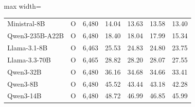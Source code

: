\begin{table}[htbp]
\begin{adjustbox}{max width=\linewidth}
\begin{tabular}{lrrrrrr}
Ministral-8B & \textsf{O} & 6{,}480 & \cellcolor[HTML]{ffb070}14.04 & \cellcolor[HTML]{ffb070}13.63 & \cellcolor[HTML]{ffb070}13.58 & \cellcolor[HTML]{ffb070}13.40 \\
Qwen3-235B-A22B & \textsf{O} & 6{,}480 & \cellcolor[HTML]{ffb070}18.40 & \cellcolor[HTML]{ffb070}18.04 & \cellcolor[HTML]{ffb070}17.99 & \cellcolor[HTML]{ffb070}15.34 \\
Llama-3.1-8B & \textsf{O} & 6{,}463 & \cellcolor[HTML]{ff8080}25.53 & \cellcolor[HTML]{ff8080}24.83 & \cellcolor[HTML]{ff8080}24.80 & \cellcolor[HTML]{ff8080}23.75 \\
Llama-3.3-70B & \textsf{O} & 6{,}465 & \cellcolor[HTML]{ff8080}28.82 & \cellcolor[HTML]{ff8080}28.20 & \cellcolor[HTML]{ff8080}28.07 & \cellcolor[HTML]{ff8080}27.55 \\
Qwen3-32B & \textsf{O} & 6{,}480 & \cellcolor[HTML]{e85050}36.16 & \cellcolor[HTML]{ff8080}34.68 & \cellcolor[HTML]{ff8080}34.66 & \cellcolor[HTML]{ff8080}33.41 \\
Qwen3-8B & \textsf{O} & 6{,}480 & \cellcolor[HTML]{e85050}45.52 & \cellcolor[HTML]{e85050}43.44 & \cellcolor[HTML]{e85050}43.18 & \cellcolor[HTML]{e85050}42.28 \\
Qwen3-14B & \textsf{O} & 6{,}480 & \cellcolor[HTML]{e85050}48.72 & \cellcolor[HTML]{e85050}46.99 & \cellcolor[HTML]{e85050}46.85 & \cellcolor[HTML]{e85050}45.99 \\
\bottomrule
\end{tabular}
\end{adjustbox}
\end{table}

